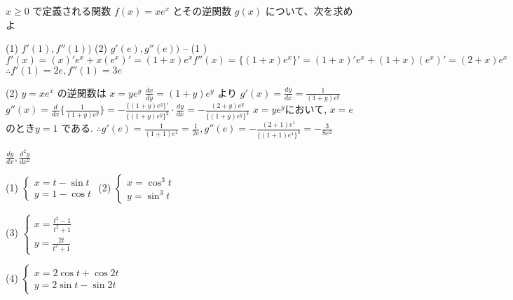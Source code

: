 $
x\geq 0$ で定義される関数 $f(x)=xe^x$ とその逆関数 $g(x)$ について、次を求めよ

(1) $f'(1), f''(1))$
(2) $g'(e), g''(e))$
--
(1 )
$
f'(x)=(x)'e^x+x(e^x)'=(1+x)e^x
f''(x)=\{(1+x)e^x\}' = (1+x)'e^x + (1+x)(e^x)' = (2+x)e^x
$
$
\therefore f'(1)=2e, f''(1)=3e
$

(2)
$
y=xe^x
$
の逆関数は
$
x=ye^y
$
$
\frac{dx}{dy}=(1+y)e^y
$
より
$
g'(x)=\frac{dy}{dx}=\frac{1}{(1+y)e^y}
$
$
g''(x)=\frac{d}{dx}\{\frac{1}{(1+y)e^y}\}=-\frac{\{(1+y)e^y\}'}{\{(1+y)e^y\}^2}\cdot\frac{dy}{dx}=-\frac{(2+y)e^y}{\{(1+y)e^y\}^3}
$
$x=ye^y$において, $x=e$ のとき$y=1$ である.
$
\therefore g'(e)=\frac{1}{(1+1)e^1}=\frac{1}{2e}, g''(e)=-\frac{(2+1)e^1}{\{(1+1)e^1\}^3}=-\frac{3}{8e^2}
$

$
\frac{dy}{dx}, 
\frac{d^2y}{dx^2}
$

(1)
$
\begin{cases}
 x=t-\sin{t}\\
 y=1-\cos{t}
\end{cases}
$
(2)
$
\begin{cases}
 x=\cos^3{t}\\
 y=\sin^3{t}
\end{cases}
$

(3)
$
\begin{cases}
 x=\frac{t^2-1}{t^2+1}\\
 y=\frac{2t}{t^2+1}
\end{cases}
$

(4)
$
\begin{cases}
 x=2\cos{t}+\cos{2t}\\
 y=2\sin{t}-\sin{2t}
\end{cases}
$

